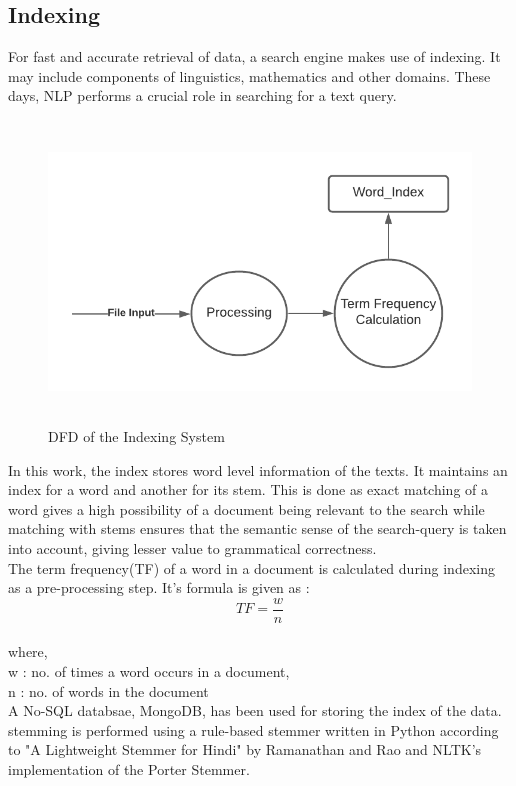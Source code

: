 \documentclass[12pt]{article}
\begin{document}
	\subsection{Indexing}
	For fast and accurate retrieval of data, a search engine makes use of indexing. It may include components of linguistics, mathematics and other domains. These days, NLP performs a crucial role in searching for a text query.\\
	\begin{figure}[H]
		\includegraphics[width=12cm, height=8cm]{Index_DFD}
		\caption{DFD of the Indexing System}
	\end{figure}
	In this work, the index stores word level information of the texts. It maintains an index for a word and another for its stem. This is done as exact matching of a word gives a high possibility of a document being relevant to the search while matching with stems ensures that the semantic sense of the search-query is taken into account, giving lesser value to grammatical correctness.\\
	The term frequency(TF) of a word in a document is calculated during indexing as a pre-processing step. It's formula is given as : \\
	\[TF = \frac{w}{n}\]\\ 
	where,\\
	w : no. of times a word occurs in a document,\\
	n : no. of words in the document\\
	A No-SQL databsae, MongoDB, has been used for storing the index of the data. stemming is performed using a rule-based stemmer written in Python according to "A Lightweight Stemmer for Hindi" by Ramanathan and Rao \cite{hstemmer} and NLTK's implementation of the Porter Stemmer.\\
\end{document}
